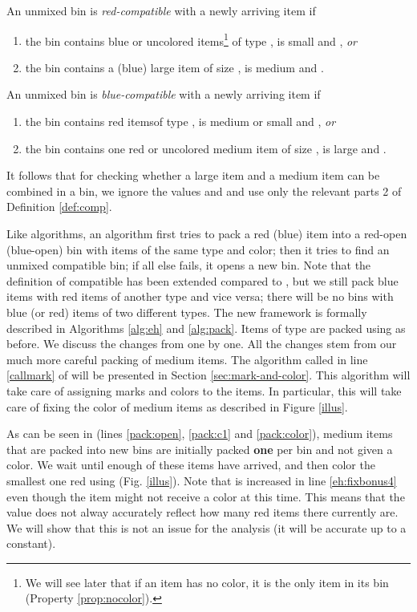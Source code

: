 \begin{definition}
\label{def:comp}
An unmixed bin is \emph{red-compatible} with a newly arriving item  if
\begin{enumerate}
\item
the bin contains blue or uncolored items\footnote{\label{fn4}We will see later that if an item has no color, it is the only item in its bin (Property \ref{prop:nocolor}).} of type ,  is small
and , \emph{or}
\item
the bin contains a (blue) large item of size ,  is medium and .
\end{enumerate}
An unmixed bin is \emph{blue-compatible} with a newly arriving item  if
\begin{enumerate}
\item
the bin contains red items\footnotemark[\value{footnote}] of type ,  is medium or small
and , \emph{or}
\item
the bin contains one red or uncolored medium item of size ,  is large and .
\end{enumerate}
\end{definition}

It follows that for checking whether a large item and a medium item can be combined in a bin, we ignore the values  and  and use only the relevant parts 2 of
Definition \ref{def:comp}. 


Like {\SuperH} algorithms, an {\EHarm} algorithm first tries to pack a red (blue) 
item into a red-open (blue-open) bin with items of the same type and color; then it tries to find an unmixed compatible bin; if all else fails, it opens a new bin. 
Note that the definition of compatible has been extended compared to {\SuperH},
but we still pack blue items with red items of another type and vice versa;
there will be no bins with blue (or red) items of two different types.
The new framework is formally described in Algorithms \ref{alg:eh} and \ref{alg:pack}.
Items of type  are packed using \nf{} as before.
We discuss the changes from {\SuperH} one by one. 
All the changes stem from our much more careful packing of medium items.
The algorithm {\MarkItems} called in line \ref{callmark} of {\EHarm} will be presented in Section \ref{sec:mark-and-color}.
This algorithm will take care of assigning marks and colors to the items. In particular, this will take care of fixing the color of medium items as described in Figure \ref{illus}.


As can be seen in {\Pack} (lines \ref{pack:open}, \ref{pack:c1} and \ref{pack:color}), medium items that are packed into new bins are initially packed \textbf{one} per bin and not given a color.
We wait until enough of these items have arrived, and then color the smallest one red using
{\MarkItems} (Fig. \ref{illus}). 
Note that  is increased in line \ref{eh:fixbonus4} even though the item might not receive a color at this time.
This means that the value  does not alway accurately reflect how many red items there currently are.
We will show that this is not an issue for the analysis (it will be accurate up to a constant).

